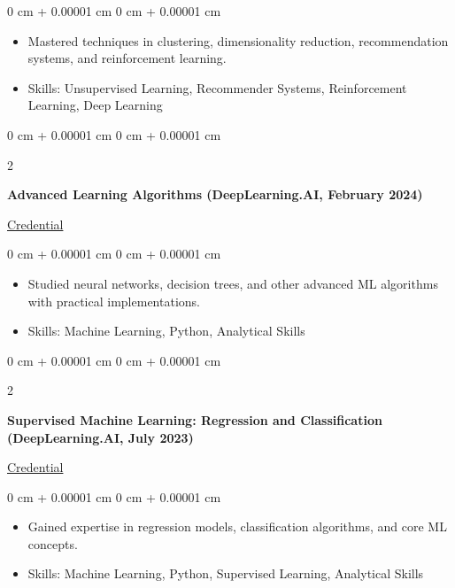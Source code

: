 \documentclass[10pt, letterpaper]{article}
\newenvironment{highlights}{
    \begin{itemize}[
        topsep=0.10 cm,
        parsep=0.10 cm,
        partopsep=0pt,
        itemsep=0pt,
        leftmargin=0 cm + 10pt
    ]
}{
    \end{itemize}
} %
\newenvironment{onecolentry}{
    \begin{adjustwidth}{
        0 cm + 0.00001 cm
    }{
        0 cm + 0.00001 cm
    }
}{
    \end{adjustwidth}
} %
\newenvironment{twocolentry}[2][]{
    \onecolentry
    \def\secondColumn{#2}
    \setcolumnwidth{\fill, 4.5 cm}
    \begin{paracol}{2}
}{
    \switchcolumn \raggedleft \secondColumn
    \end{paracol}
    \endonecolentry
} %
\begin{document}
        \begin{onecolentry}
            \begin{highlights}
                \item Mastered techniques in clustering, dimensionality reduction, recommendation systems, and reinforcement learning.
                \item Skills: Unsupervised Learning, Recommender Systems, Reinforcement Learning, Deep Learning
            \end{highlights}
        \end{onecolentry}
        \vspace{0.2 cm}

        \begin{twocolentry}
            {\href{https://www.coursera.org/account/accomplishments/verify/CWGADX38LPCR}{Credential}}
            \textbf{Advanced Learning Algorithms (DeepLearning.AI, February 2024)}
        \end{twocolentry}
        \vspace{0.10 cm}
        
        \begin{onecolentry}
            \begin{highlights}
                \item Studied neural networks, decision trees, and other advanced ML algorithms with practical implementations.
                \item Skills: Machine Learning, Python, Analytical Skills
            \end{highlights}
        \end{onecolentry}
        \vspace{0.2 cm}

        \begin{twocolentry}
            {\href{https://www.coursera.org/account/accomplishments/verify/CFF4985BPNX8}{Credential}}
            \textbf{Supervised Machine Learning: Regression and Classification (DeepLearning.AI, July 2023)}
        \end{twocolentry}
        \vspace{0.10 cm}
        
        \begin{onecolentry}
            \begin{highlights}
                \item Gained expertise in regression models, classification algorithms, and core ML concepts.
                \item Skills: Machine Learning, Python, Supervised Learning, Analytical Skills
            \end{highlights}
        \end{onecolentry}
        \vspace{0.2 cm}
\end{document}
